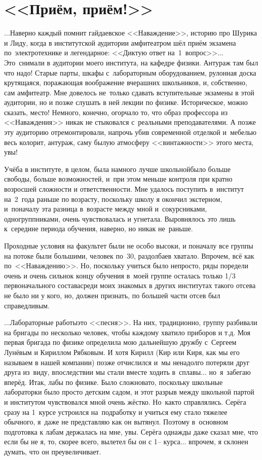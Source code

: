 \newpage
\section*{<<Приём, приём!>>}

$\ldots$Наверно каждый помнит гайдаевское <<Наваждение>>, историю про Шурика и Лиду, когда в институтской аудитории амфитеатром шёл приём экзамена по~электротехнике и легендарное: <<Диктую ответ на~1~вопрос>>$\ldots$ Это~снимали в аудитории моего института, на кафедре физики. Антураж там был что надо! Старые парты, шкафы с~лабораторным оборудованием, рулонная доска крутящаяся, поражающая воображение вчерашних школьников, и, собственно, сам амфитеатр. Мне довелось не~только сдавать вступительные экзамены в этой аудитории, но и позже слушать в ней лекции по физике. Историческое, можно сказать, место! Немного, конечно, огорчало то, что образ профессора из <<Наваждения>> никак не стыковался с~реальными преподавателями. А позже эту аудиторию отремонтировали, напрочь убив современной отделкой и~мебелью весь колорит, антураж, саму былую атмосферу <<винтажности>> этого места, увы!

Учёба в институте, в целом, была намного лучше школьной\mdash было больше свободы, больше возможностей, и~при этом меньше контроля при кратно возросшей сложности и ответственности. Мне удалось поступить в~институт на~2~года раньше по возрасту, поскольку школу я окончил экстерном, и~поначалу эта разница в~возрасте между мной и~сокурсниками, одногруппниками, очень чувствовалась и угнетала. Выровнялось это лишь к~середине периода обучения, наверно, но никак не~раньше.

Проходные условия на факультет были не особо высоки, и поначалу все группы на потоке были большими, человек по~30, раздолбаев хватало. Впрочем, всё как по~<<Наваждению>>. Но, поскольку учиться было непросто, ряды поредели очень и очень сильно\mdash к концу обучения в~моей группе осталась только 1/3 первоначального состава\mdash среди моих знакомых в других институтах такого отсева не было ни у кого, но, должен признать, по большей части отсев был справедливым.

$\ldots$Лабораторные работы\mdash это <<песня>>. На них, традиционно, группу разбивали на бригады по несколько человек, чтобы каждому хватило приборов и т.д. Моя первая бригада по физике определила мою дальнейшую дружбу с~Сергеем Лунёвым и Кириллом Рябковым. И хотя Кирилл (Кир или Киря, как мы его называем в нашей компании) позже отчислился и~мы ненадолго потеряли друг друга из~виду, впоследствии мы стали вместе ходить в~сплавы$\ldots$ но~я~забегаю вперёд. Итак, лабы по физике. Было сложновато, поскольку школьные лабораторки было просто детским садом, и этот разрыв между школьной партой и институтом чувствовался мной очень жёстко. Но~как\sdash то справлялись. Серёга сразу на 1~курсе устроился на~подработку и учиться ему стало тяжелее обычного, я~даже не представляю как он вытянул. Поэтому в~основном подготовка к лабам держалась на мне, увы. Серёга однажды даже сказал мне, что если бы не я, то, скорее всего, вылетел бы он с 1\thinspace\nobreakdash-- курса$\ldots$ впрочем, я склонен думать, что он преувеличивает. 

